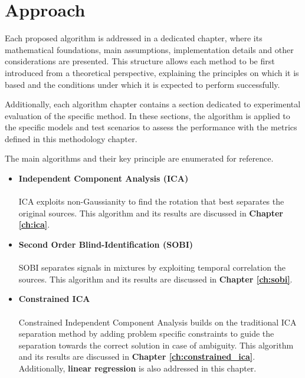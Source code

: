 
\section{Approach}

Each proposed algorithm is addressed in a dedicated chapter, where its mathematical foundations, main assumptions, implementation details and other considerations are presented. This structure allows each method to be first introduced from a theoretical perspective, explaining the principles on which it is based and the conditions under which it is expected to perform successfully.

Additionally, each algorithm chapter contains a section dedicated to experimental evaluation of the specific method. In these sections, the algorithm is applied to the specific models and test scenarios to assess the performance with the metrics defined in this methodology chapter. 

\noindent The main algorithms and their key principle are enumerated for reference.

\begin{itemize}
    \item \textbf{Independent Component Analysis (ICA)} \\ \\
    ICA exploits non-Gaussianity to find the rotation that best separates the original sources. This algorithm and its results are discussed in \textbf{Chapter \ref{ch:ica}}.
\end{itemize}

\begin{itemize}
    \item \textbf{Second Order Blind-Identification (SOBI)} \\ \\
    SOBI separates signals in mixtures by exploiting temporal correlation the sources. This algorithm and its results are discussed in \textbf{Chapter \ref{ch:sobi}}.
\end{itemize}
\begin{itemize}
    \item \textbf{Constrained ICA} 
     \\ \\
    Constrained Independent Component Analysis builds on the traditional ICA separation method by adding problem specific constraints to guide the separation towards the correct solution in case of ambiguity. This algorithm and its results are discussed in \textbf{Chapter \ref{ch:constrained_ica}}. Additionally, \textbf{linear regression} is also addressed in this chapter.
\end{itemize}


